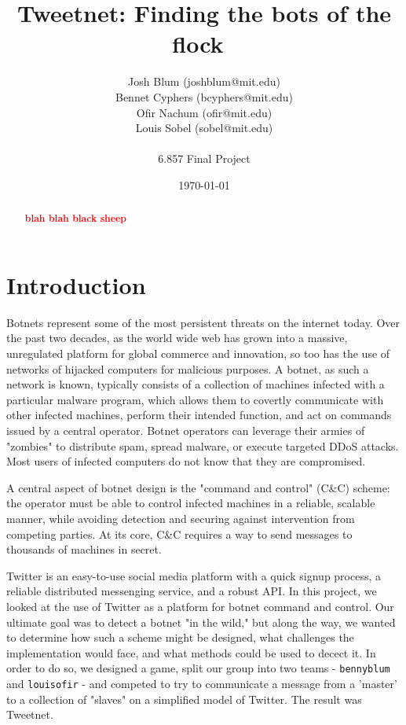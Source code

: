 \documentclass[11pt, oneside]{article} %
\title{ 
Tweetnet: Finding the bots of the flock\
}
\author{
Josh Blum (joshblum@mit.edu)\\
Bennet Cyphers (bcyphers@mit.edu)\\
Ofir Nachum (ofir@mit.edu)\\
Louis Sobel (sobel@mit.edu)\\
\\
6.857 Final Project
\date{\today}
}
\numberwithin{equation}{section} %
\numberwithin{figure}{section} %
\numberwithin{table}{section} %
\renewcommand{\c}[1]{\texttt{#1}}
\newcommand\todo[1]{\textbf{\textcolor{red}{#1}}}
\newcommand{\teambb}{\c{bennyblum}}
\newcommand{\teamol}{\c{louisofir}}
\begin{document}
\maketitle

\vfill

\begin{abstract}
\todo{blah blah black sheep}
\end{abstract}

\clearpage

\section {Introduction}
Botnets represent some of the most persistent threats on the internet today.
Over the past two decades, as the world wide web has grown into a massive,
unregulated platform for global commerce and innovation, so too has the use of
networks of hijacked computers for malicious purposes. A botnet, as such a
network is known, typically consists of a collection of machines infected with a
particular malware program, which allows them to covertly communicate with other
infected machines, perform their intended function, and act on commands issued
by a central operator. Botnet operators can leverage their armies of "zombies"
to distribute spam, spread malware, or execute targeted DDoS attacks. Most users
of infected computers do not know that they are compromised. 

A central aspect of botnet design is the "command and control" (C\&C) scheme:
the operator must be able to control infected machines in a reliable, scalable
manner, while avoiding detection and securing against intervention from
competing parties. At its core, C\&C requires a way to send messages to thousands
of machines in secret.

Twitter is an easy-to-use social media platform with a quick signup process, a
reliable distributed messenging service, and a robust API. In this project, we
looked at the use of Twitter as a platform for botnet command and control. Our
ultimate goal was to detect a botnet "in the wild," but along the way, we wanted
to determine how such a scheme might be designed, what challenges the
implementation would face, and what methods could be used to decect it. In order
to do so, we designed a game, split our group into two teams - \teambb{} and
\teamol{} - and competed to try to communicate a message from a 'master' to a
collection of "slaves" on a simplified model of Twitter. The result was
Tweetnet.
\end{document}
